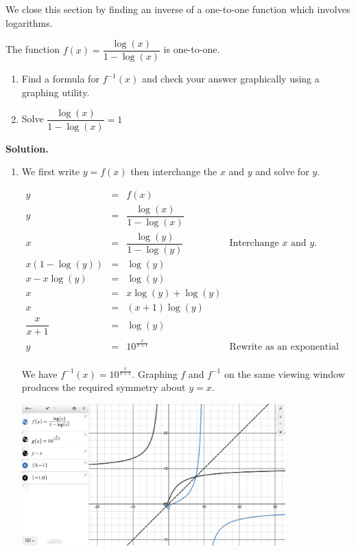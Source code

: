 \documentclass{ximera}
\begin{document}
\smallskip

We close this section by finding an inverse of a one-to-one function which involves logarithms.

\begin{ex}  \label{logfracinverse} The function $f(x) = \dfrac{\log(x)}{1-\log(x)}$ is one-to-one. 

\begin{enumerate}

\item  Find a formula for $f^{-1}(x)$ and check your answer graphically using a graphing utility.

\item Solve  $\dfrac{\log(x)}{1-\log(x)} = 1$

\end{enumerate}

{\bf Solution.} \begin{enumerate} \item  We first write $y=f(x)$ then interchange the $x$ and $y$ and solve for $y$.

\[ \begin{array}{rclr}
y & = & f(x) & \\ 
y  & = & \dfrac{\log(x)}{1-\log(x)} & \\[8pt]
x  & = & \dfrac{\log(y)}{1-\log(y)} & \text{Interchange $x$ and $y$.}\\[8pt]
x\left(1-\log(y)\right) & = & \log(y) & \\ 
x - x\log(y)  & = & \log(y) & \\ 
x & = & x \log(y) + \log(y) & \\ 
x & = & (x+1) \log(y) & \\ 
\dfrac{x}{x+1}  & = & \log(y) & \\ 
y & = & 10^{\frac{x}{x+1}} & \text{Rewrite as an exponential equation.}\\

\end{array}\]



We have $f^{-1}(x) = 10^{\frac{x}{x+1}}$.  Graphing $f$ and $f^{-1}$ on the same viewing window produces the required symmetry about $y=x$.

\begin{center}

\includegraphics[width=4in]{./LogarithmicEquationsandInequalitiesGraphics/LogEqnEx11.jpg}


\end{center}
\end{enumerate}
\end{ex}
\end{document}
